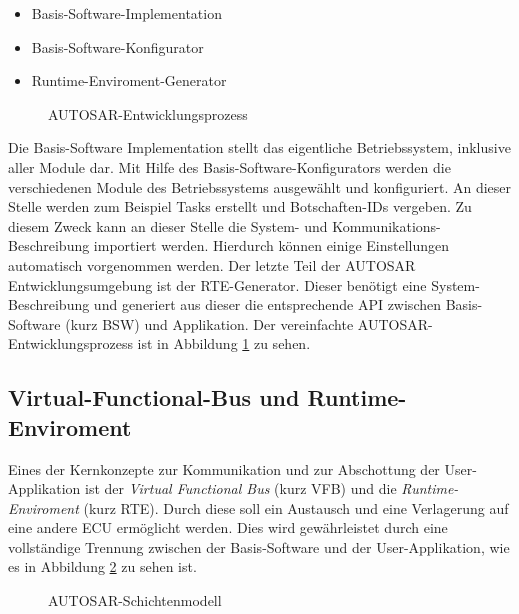 \documentclass[
  a4paper,					    %
  twoside,
  DIV=calc,     				%
  bibliography=totoc,
  cleardoublepage=empty,
  ngerman,     					%
  final       					%
]{scrbook}
\begin{document}
\begin{itemize}
    \item Basis-Software-Implementation
    \item Basis-Software-Konfigurator
    \item Runtime-Enviroment-Generator
\end{itemize}

\begin{figure}[tb]
    \centering
    \resizebox{\linewidth}{!}{}
    \caption{AUTOSAR-Entwicklungsprozess}
    \label{fig:autosar_prozess}
\end{figure}

Die Basis-Software Implementation stellt das eigentliche Betriebssystem, inklusive aller Module dar. Mit Hilfe des Basis-Software-Konfigurators werden die verschiedenen Module des Betriebssystems ausgewählt und konfiguriert. An dieser Stelle werden zum Beispiel Tasks erstellt und Botschaften-IDs vergeben. Zu diesem Zweck kann an dieser Stelle die System- und Kommunikations-Beschreibung importiert werden. Hierdurch können einige Einstellungen automatisch vorgenommen werden. Der letzte Teil der AUTOSAR Entwicklungsumgebung ist der RTE-Generator. Dieser benötigt eine System-Beschreibung und generiert aus dieser die entsprechende API zwischen Basis-Software (kurz BSW) und Applikation. Der vereinfachte AUTOSAR-Entwicklungsprozess ist in Abbildung \ref{fig:autosar_prozess} zu sehen.



\subsection{Virtual-Functional-Bus und Runtime-Enviroment}
\label{sec:vfb}
Eines der Kernkonzepte zur Kommunikation und zur Abschottung der User-Applikation ist der \emph{Virtual Functional Bus} (kurz VFB) und die \emph{Runtime-Enviroment} (kurz RTE). Durch diese soll ein Austausch und eine Verlagerung auf eine andere ECU ermöglicht werden. Dies wird gewährleistet durch eine vollständige Trennung zwischen der Basis-Software und der User-Applikation, wie es in Abbildung \ref{fig:autosar_layer} zu sehen ist. 

\begin{figure}[tb]
    \centering
    \resizebox{\linewidth}{!}{}
    \caption{AUTOSAR-Schichtenmodell}
    \label{fig:autosar_layer}
\end{figure}
\end{document}
